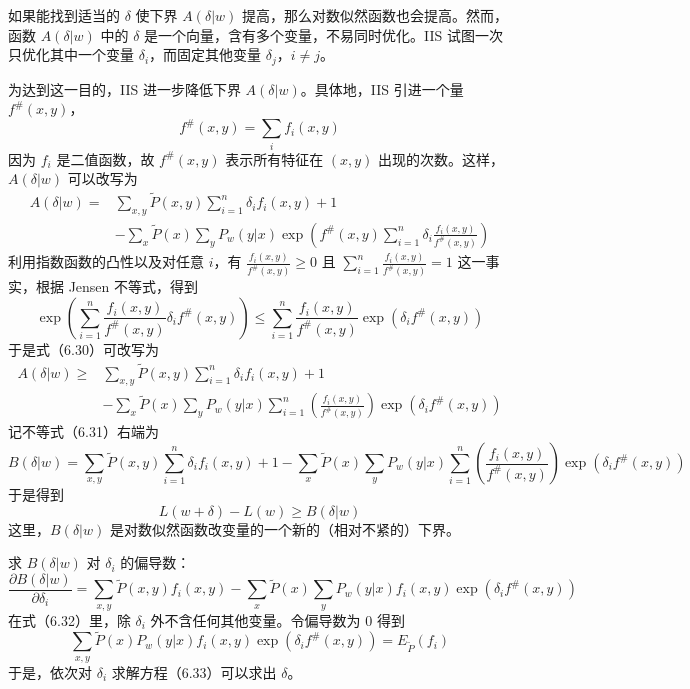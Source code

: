 \documentclass[UTF8, 12pt, fontset=fandol, oneside]{ctexart}
\begin{document}
如果能找到适当的 $\delta$ 使下界 $A(\delta|w)$ 提高，那么对数似然函数也会提高。然而，函数 $A(\delta|w)$ 中的 $\delta$ 是一个向量，含有多个变量，不易同时优化。IIS 试图一次只优化其中一个变量 $\delta_i$，而固定其他变量 $\delta_j$，$i\neq j$。

为达到这一目的，IIS 进一步降低下界 $A(\delta|w)$。具体地，IIS 引进一个量 $f^\#(x,y)$，
\[
f^\#(x,y)=\sum_i f_i(x,y)
\]
因为 $f_i$ 是二值函数，故 $f^\#(x,y)$ 表示所有特征在 $(x,y)$ 出现的次数。这样，$A(\delta|w)$ 可以改写为
\begin{equation}
\begin{aligned}
A(\delta|w)={}&\sum_{x,y}\tilde{P}(x,y)\sum_{i=1}^n\delta_i f_i(x,y)+1\\
&-\sum_x\tilde{P}(x)\sum_y P_w(y|x)\exp\left(f^\#(x,y)\sum_{i=1}^n\delta_i\frac{f_i(x,y)}{f^\#(x,y)}\right)
\end{aligned}
\tag{6.30}
\end{equation}
利用指数函数的凸性以及对任意 $i$，有 $\frac{f_i(x,y)}{f^\#(x,y)}\geq 0$ 且 $\sum_{i=1}^n\frac{f_i(x,y)}{f^\#(x,y)}=1$ 这一事实，根据 Jensen 不等式，得到
\[
\exp\left(\sum_{i=1}^n\frac{f_i(x,y)}{f^\#(x,y)}\delta_i f^\#(x,y)\right)
\leq \sum_{i=1}^n\frac{f_i(x,y)}{f^\#(x,y)}\exp(\delta_i f^\#(x,y))
\]
于是式（6.30）可改写为
\begin{equation}
\begin{aligned}
A(\delta|w)\geq{}& \sum_{x,y}\tilde{P}(x,y)\sum_{i=1}^n\delta_i f_i(x,y)+1\\
&-\sum_x\tilde{P}(x)\sum_y P_w(y|x)\sum_{i=1}^n\left(\frac{f_i(x,y)}{f^\#(x,y)}\right)\exp(\delta_i f^\#(x,y))
\end{aligned}
\tag{6.31}
\end{equation}
记不等式（6.31）右端为
\[
B(\delta|w)=\sum_{x,y}\tilde{P}(x,y)\sum_{i=1}^n\delta_i f_i(x,y)+1
-\sum_x\tilde{P}(x)\sum_y P_w(y|x)\sum_{i=1}^n\left(\frac{f_i(x,y)}{f^\#(x,y)}\right)\exp(\delta_i f^\#(x,y))
\]
于是得到
\[
L(w+\delta)-L(w)\geq B(\delta|w)
\]
这里，$B(\delta|w)$ 是对数似然函数改变量的一个新的（相对不紧的）下界。

求 $B(\delta|w)$ 对 $\delta_i$ 的偏导数：
\begin{equation}
\frac{\partial B(\delta|w)}{\partial\delta_i}
=\sum_{x,y}\tilde{P}(x,y)f_i(x,y)
-\sum_x\tilde{P}(x)\sum_y P_w(y|x)f_i(x,y)\exp(\delta_i f^\#(x,y))
\tag{6.32}
\end{equation}
在式（6.32）里，除 $\delta_i$ 外不含任何其他变量。令偏导数为 0 得到
\begin{equation}
\sum_{x,y}\tilde{P}(x)P_w(y|x)f_i(x,y)\exp(\delta_i f^\#(x,y))=E_{\tilde{P}}(f_i)
\tag{6.33}
\end{equation}
于是，依次对 $\delta_i$ 求解方程（6.33）可以求出 $\delta$。
\end{document}
